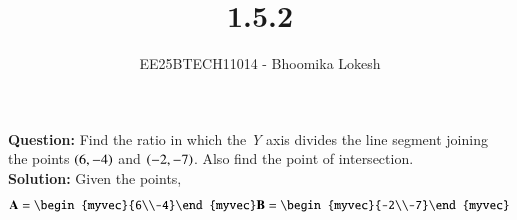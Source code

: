 \documentclass[journal]{IEEEtran}
\begin{document}

\vspace{3cm}

\title{1.5.2}
\author{EE25BTECH11014 - Bhoomika Lokesh}
{\let\newpage\relax\maketitle}

\renewcommand{\thefigure}{\theenumi}
\renewcommand{\thetable}{\theenumi}
\setlength{\intextsep}{10pt} %


\renewcommand{\thetable}{\theenumi}

\textbf{Question:}  Find the ratio in which the \textit{Y} axis divides the line segment joining the points $\left(6,-4\right)$ and $\left(-2,-7\right)$. Also find the point of intersection.\\

\textbf{Solution:}
Given the points,
\begin{align}
    \vec{A}=\begin{myvec}{6\\-4}\end{myvec}
    \vec{B}=\begin{myvec}{-2\\-7}\end{myvec}
\end{align}
\end{document}
